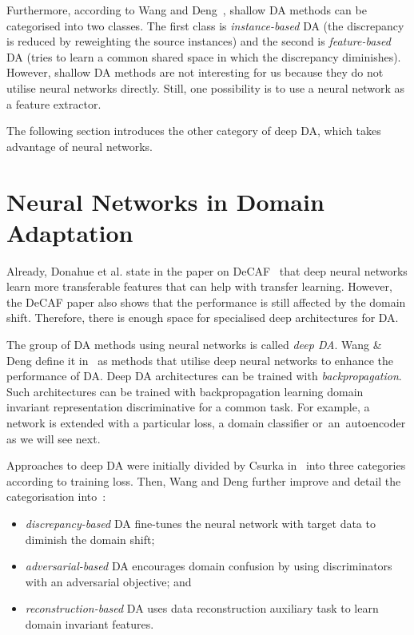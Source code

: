 Furthermore, according to Wang and Deng~\cite{wang2018},
shallow DA methods can be categorised into two classes.
The first class is \textit{instance-based} DA
(the discrepancy is reduced by reweighting the source instances)
and the second is \textit{feature-based} DA
(tries to learn a common shared space in which the discrepancy diminishes).
However, shallow DA methods are not interesting for us
because they do not utilise neural networks directly.
Still, one possibility is to use a neural network as a feature extractor.~\cite{csurka2017}

The following section introduces the other category of deep DA,
which takes advantage of neural networks.

\section{Neural Networks in Domain Adaptation}

Already, Donahue et al. state in the paper on DeCAF~\cite{donahue2014}
that deep neural networks learn more transferable features
that can help with transfer learning.
However, the DeCAF paper also shows
that the performance is still affected by the domain shift.
Therefore, there is enough space for specialised deep architectures for DA.

The group of DA methods using neural networks is called \textit{deep DA}.
Wang \& Deng define it in~\cite{wang2018} as methods that utilise deep neural networks to enhance the performance of DA.
Deep DA architectures can be trained with \textit{backpropagation}.
Such architectures can be trained with backpropagation
learning domain invariant representation discriminative for a common task.
For example, a network is extended with a particular loss, a domain classifier or~an~autoencoder as we will see next.

Approaches to deep DA were initially divided by Csurka in~\cite{csurka2017} into three categories according to training loss.
Then, Wang and Deng further improve and detail the categorisation into~\cite{wang2018}:

\begin{itemize}
	\item \textit{discrepancy-based} DA fine-tunes the neural network
		with target data to diminish the domain shift;
	\item \textit{adversarial-based} DA encourages domain confusion
		by using discriminators with an adversarial objective; and
	\item \textit{reconstruction-based} DA uses data reconstruction auxiliary task to learn domain invariant features.
\end{itemize}

